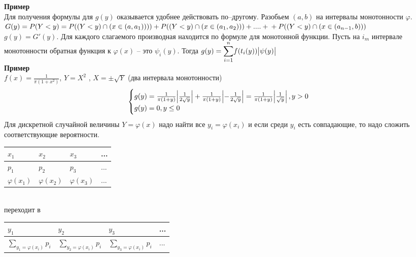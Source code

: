 \documentclass[russian, 12pt, fleqn]{article}
\begin{document}
\noindent
\textbf{Пример} \\
Для получения формулы для $g(y)$ оказывается удобнее действовать по--другому. Разобьем $(a, b)$ на интервалы монотонности $\varphi$.\\
$G(y) = P(Y<y) = P((Y < y) \cap (x \in (a, a_1)))) + P((Y < y) \cap (x \in (a_1, a_2)))  +  ....  + \\+P((Y < y) \cap (x \in (a_{n-1}, b)))$\\
$g(y) = G'(y)$. Для каждого слагаемого производная находится по формуле для монотонной функции. Пусть на $i_m$ интервале монотонности обратная функция к $\varphi(x)$ -- это $\psi_i(y)$. Тогда $g(y) = \displaystyle{\sum\limits_{i = 1}^{n}} f(t_i(y))\abs{\psi(y)}$\\
\textbf{Пример} \\
$f(x) = \frac{1}{\pi (1+x^2)}$, $Y=X^2$ , $X = \pm \sqrt{Y}$ (два интервала монотонности)\\
\begin{equation*} 
 \begin{cases}
   g(y) = \frac{1}{\pi(1+y)} \abs{\frac{1}{2\sqrt{y}}} + \frac{1}{\pi(1+y)} \abs{-\frac{1}{2\sqrt{y}}} = \frac{1}{\pi(1+y)} \abs{\frac{1}{\sqrt{y}}}, y > 0 \\
   g(y) = 0, y \leq 0
 \end{cases}
\end{equation*}
Для дискретной случайной величины $Y=\varphi(x)$ надо найти все $y_i = \varphi(x_i)$ и если среди $y_i$ есть совпадающие, то надо сложить соответствующие вероятности.\\
\begin{tabular}[b]{ | l | l |  l | l |   }
\hline
$x_1$ & $x_2$ & $x_3$ & ... \\
\hline
$p_1$ & $p_2$ & $p_3$ & ... \\
\hline
$\varphi(x_1)$ & $\varphi(x_2)$ & $\varphi(x_3)$ & ... \\
\hline
\end{tabular}\\
переходит в\\
\begin{tabular}[b]{ | l | l |  l | l |   }
\hline
$y_1$ & $y_2$ & $y_3$ & ... \\
\hline
$\displaystyle{\sum_{y_1 = \varphi (x_i) } } p_i$ & $\displaystyle{\sum_{y_2 = \varphi (x_i) } } p_i$ & $\displaystyle{\sum_{y_3 = \varphi (x_i) } } p_i$ & ... \\
\hline
\end{tabular}\\
\end{document}
